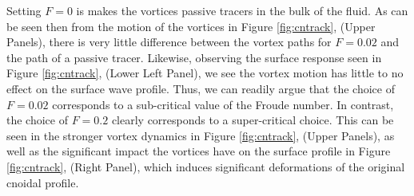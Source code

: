 \documentclass[a4paper,11pt]{article}
\begin{document}
Setting $F=0$ is makes the vortices passive tracers in the bulk of the fluid.  As can be seen then from the motion of the vortices in Figure \ref{fig:cntrack}, (Upper Panels), there is very little difference between the vortex paths for $F=0.02$ and the path of a passive tracer.  Likewise, observing the surface response seen in Figure \ref{fig:cntrack}, (Lower Left Panel), we see the vortex motion has little to no effect on the surface wave profile.  Thus, we can readily argue that the choice of $F=0.02$ corresponds to a sub-critical value of the Froude number.  In contrast, the choice of $F=0.2$ clearly corresponds to a super-critical choice.  This can be seen in the stronger vortex dynamics in Figure \ref{fig:cntrack}, (Upper Panels), as well as the significant impact the vortices have on the surface profile in Figure \ref{fig:cntrack}, (Right Panel), which induces significant deformations of the original cnoidal profile.   
\end{document}
